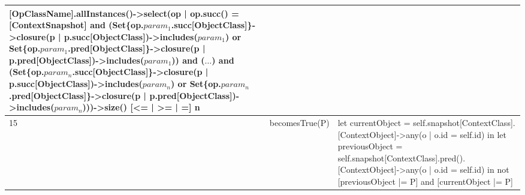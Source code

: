 \begin{longtable}{|>{\footnotesize}p{0.6cm}|>{\scriptsize\raggedright\arraybackslash}p{4cm}|>{\scriptsize\raggedright\arraybackslash}p{\dimexpr\textwidth-4.6cm-4\tabcolsep-3\arrayrulewidth\relax}|}
    [OpClassName].allInstances()->select(op | op.succ() = [ContextSnapshot] and
    (Set\{op.$param_1$.succ[ObjectClass]\}->closure(p | p.succ[ObjectClass])->includes($param_1$) or Set\{op.$param_1$.pred[ObjectClass]\}->closure(p | p.pred[ObjectClass])->includes($param_1$)) 
    and ($\ldots$) 
    and (Set\{op.$param_n$.succ[ObjectClass]\}->closure(p | p.succ[ObjectClass])->includes($param_n$) or Set\{op.$param_n$.pred[ObjectClass]\}->closure(p | p.pred[ObjectClass])->includes($param_n$)))->size() [<= | >= | =] n \\
    \hline
    15 &
    becomesTrue(P) &
    let currentObject = self.snapshot[ContextClass].[ContextObject]->any(o | o.id = self.id) in
    let previousObject = self.snapshot[ContextClass].pred().[ContextObject]->any(o | o.id = self.id) in 
    not [previousObject |= P] and [currentObject |= P] \\
    \hline
\end{longtable}
